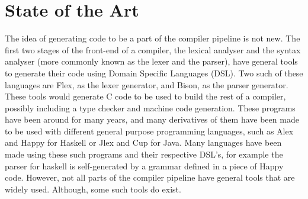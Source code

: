 \chapter{State of the Art}

The idea of generating code to be a part of the compiler pipeline is not new.
The first two stages of the front-end of a compiler, the lexical analyser and the syntax analyser (more commonly known as the lexer and the parser), have general tools to generate their code using Domain Specific Languages (DSL)\cite{Bentley:1986:PPL:6424.315691,van2000domain}.
Two such of these languages are Flex, as the lexer generator, and Bison, as the parser generator.
These tools would generate C code to be used to build the rest of a compiler, possibly including a type checker and machine code generation.
These programs have been around for many years, and many derivatives of them have been made to be used with different general purpose programming languages, such as Alex and Happy for Haskell or Jlex and Cup for Java\cite{ranta2012implementing}.
Many languages have been made using these such programs and their respective DSL's, for example the parser for haskell is self-generated by a grammar defined in a piece of Happy code.
However, not all parts of the compiler pipeline have general tools that are widely used.
Although, some such tools do exist\cite{grimm2007typical,ruler:10.1007/11737414_4}.


